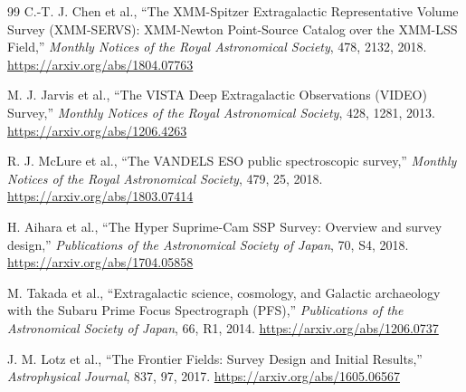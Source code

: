 \begin{thebibliography}{99}
C.-T. J. Chen et al.,
``The XMM-Spitzer Extragalactic Representative Volume Survey (XMM-SERVS): XMM-Newton Point-Source Catalog over the XMM-LSS Field,''
\emph{Monthly Notices of the Royal Astronomical Society}, 478, 2132, 2018.
\url{https://arxiv.org/abs/1804.07763}

M. J. Jarvis et al.,
``The VISTA Deep Extragalactic Observations (VIDEO) Survey,''
\emph{Monthly Notices of the Royal Astronomical Society}, 428, 1281, 2013.
\url{https://arxiv.org/abs/1206.4263}

R. J. McLure et al.,
``The VANDELS ESO public spectroscopic survey,''
\emph{Monthly Notices of the Royal Astronomical Society}, 479, 25, 2018.
\url{https://arxiv.org/abs/1803.07414}

H. Aihara et al.,
``The Hyper Suprime-Cam SSP Survey: Overview and survey design,''
\emph{Publications of the Astronomical Society of Japan}, 70, S4, 2018.
\url{https://arxiv.org/abs/1704.05858}

M. Takada et al.,
``Extragalactic science, cosmology, and Galactic archaeology with the Subaru Prime Focus Spectrograph (PFS),''
\emph{Publications of the Astronomical Society of Japan}, 66, R1, 2014.
\url{https://arxiv.org/abs/1206.0737}

J. M. Lotz et al.,
``The Frontier Fields: Survey Design and Initial Results,''
\emph{Astrophysical Journal}, 837, 97, 2017.
\url{https://arxiv.org/abs/1605.06567}

\end{thebibliography}
